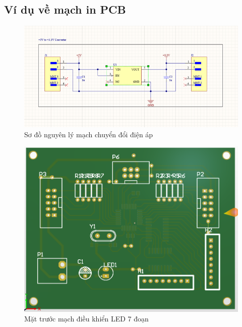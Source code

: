         \subsection{Ví dụ về mạch in PCB}
            \begin{figure}[H]
                \centering
                \includegraphics[width=1\textwidth]{pictures/sch1.png}
                \caption{Sơ đồ nguyên lý mạch chuyển đổi điện áp}
                \label{fig:sodonguyenly}
            \end{figure}
            \begin{figure}[H]
                \centering
                \includegraphics[width=1\textwidth]{pictures/pcb1.png}
                \caption{Mặt trước mạch điều khiển LED 7 đoạn}
                \label{fig:hbridge}
            \end{figure}
